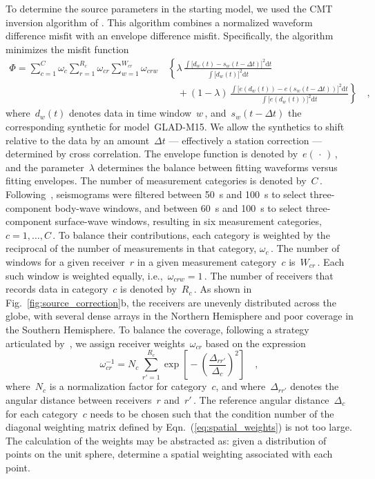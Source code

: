 To determine the source parameters in the starting model,
we used the CMT inversion algorithm of \cite{liu2004spectral}.
This algorithm combines a normalized waveform difference misfit with an envelope difference misfit.
Specifically, the algorithm minimizes the misfit function
\begin{equation}
   \begin{split}
      \Phi =  \sum\limits_{c=1}^{C} \omega_c \sum\limits_{r=1}^{R_c} \omega_{cr}
       \sum\limits_{w=1}^{W_{cr}} \omega_{crw}\,
          & \left\{ \lambda\, \frac
              { \int \big[ d_w(t) - s_w(t - \Delta t) \big]^2 \mathrm{d}t}
              {\int \big[ d_w(t) \big]^2  \mathrm{d}t} \right.
       \\ & \quad \left. \mbox{} + (1 - \lambda)\, \frac
              {\int \big[ e(d_w(t)) - e(s_w(t - \Delta t)) \big]^2 \mathrm{d}t}
              {\int \big[ e(d_w(t)) \big]^2\mathrm{d}t} \right\}
              \quad ,
   \end{split}
\end{equation}
where~$d_w(t)$ denotes data in time window~$w$\,,
and~$s_w(t - \Delta t)$ the corresponding synthetic for model~GLAD-M15.
We allow the synthetics to shift relative to the data by an amount~$\Delta t$
--- effectively a station correction --- determined by cross correlation.
The envelope function is denoted by~$e(\,\cdot\,)$\,,
and the parameter~$\lambda$ determines the balance between fitting waveforms versus fitting envelopes.
The number of measurement categories is denoted by~$C$\,.
Following~\cite{ekstrom2012global},
seismograms were filtered between 50~s and 100~s
to select three-component body-wave windows,
and between 60~s and 100~s to select three-component
surface-wave windows,
resulting in six measurement categories, $c=1,\ldots,C$\,.
To balance their contributions,
each category is weighted by the reciprocal of the number of measurements in that
category, $\omega_c$\,.
The number of windows for a given receiver~$r$ in a given measurement category~$c$ is~$W_{cr}$\,.
Each such window is weighted equally, i.e.,~$\omega_{crw}=1$\,.
The number of receivers that records data in category~$c$ is denoted by~$R_c$\,.
As shown in Fig.~\ref{fig:source_correction}b,
the receivers are unevenly distributed across the globe,
with several dense arrays in the Northern Hemisphere and poor coverage in the Southern Hemisphere.
To balance the coverage,
following a strategy articulated by~\cite{Ruanetal2018},
we assign receiver weights~$\omega_{cr}$ based on the expression
\begin{equation}
\omega_{cr}^{-1} = N_c\,\sum_{r'=1}^{R_c} \exp\left[\mbox{}-\left(\frac{\Delta_{rr'}}{\Delta_c}\right)^2\right]
\quad ,
\label{eq:spatial_weights}
\end{equation}
where~$N_c$ is a normalization factor for category~$c$,
and where~$\Delta_{rr'}$ denotes the angular distance between receivers~$r$ and~$r'$\,.
The reference angular distance~$\Delta_c$ for each category~$c$ needs to be chosen such that the condition 
number of the diagonal weighting matrix defined by Eqn.~(\ref{eq:spatial_weights}) is not too large.
The calculation of the weights may be abstracted as: given a distribution of
points on the unit sphere, determine a spatial weighting associated with each point.

